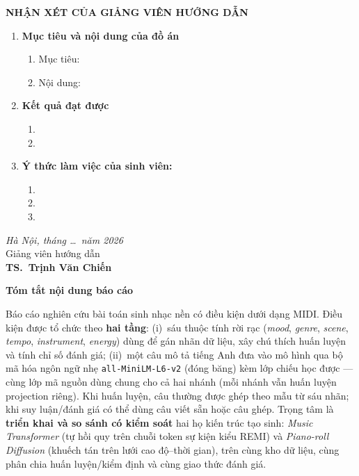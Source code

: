\documentclass[oneside, a4paper, 12pt]{book}
\theoremstyle{plain}
\theoremstyle{definition}
\theoremstyle{remark}
\begin{document}
\fontsize{13pt}{16pt}\selectfont
\bigbreak
\begin{center}
	{\bfseries NHẬN XÉT CỦA GIẢNG VIÊN HƯỚNG DẪN}
\end{center}
\bigbreak

\fontsize{12pt}{14pt}\selectfont
\begin{enumerate}
	\item [{\bfseries 1.}]{\bfseries Mục tiêu và nội dung của đồ án}
	\begin{enumerate}
		\item Mục tiêu:
		\item Nội dung:
	\end{enumerate}
	\item [{\bfseries 2.}] {\bfseries Kết quả đạt được}
	\begin{enumerate}
		\item
		\item
	\end{enumerate}
	\item [{\bfseries 3.}]{\bfseries Ý thức làm việc của sinh viên:}
\begin{enumerate}
	\item
	\item
	\item
\end{enumerate}
\end{enumerate}
\hspace{0.5\textwidth}
\begin{minipage}{0.5\textwidth}
	\noindent\begin{center}
		\textit{Hà Nội, tháng \ldots\ năm 2026} \\
		Giảng viên hướng dẫn\\ \vspace{2cm}
		\textbf{TS.\ Trịnh Văn Chiến}
	\end{center}
\end{minipage}
\restoregeometry


\newpage
\restoregeometry

\newpage
\fontsize{16pt}{18pt}\selectfont
\thispagestyle{empty}

{\bfseries Tóm tắt nội dung báo cáo}
\fontsize{12pt}{16pt}\selectfont
\bigskip

Báo cáo nghiên cứu bài toán sinh nhạc nền có điều kiện dưới dạng MIDI. Điều kiện được tổ chức theo \textbf{hai tầng}: (i)~sáu thuộc tính rời rạc (\textit{mood}, \textit{genre}, \textit{scene}, \textit{tempo}, \textit{instrument}, \textit{energy}) dùng để gán nhãn dữ liệu, xây chú thích huấn luyện và tính chỉ số đánh giá; (ii)~một câu mô tả tiếng Anh đưa vào mô hình qua bộ mã hóa ngôn ngữ nhẹ \texttt{all-MiniLM-L6-v2} (đóng băng) kèm lớp chiếu học được --- cùng lớp mã nguồn dùng chung cho cả hai nhánh (mỗi nhánh vẫn huấn luyện projection riêng). Khi huấn luyện, câu thường được ghép theo mẫu từ sáu nhãn; khi suy luận/đánh giá có thể dùng câu viết sẵn hoặc câu ghép. Trọng tâm là \textbf{triển khai và so sánh có kiểm soát} hai họ kiến trúc tạo sinh: \textit{Music Transformer} (tự hồi quy trên chuỗi token sự kiện kiểu REMI) và \textit{Piano-roll Diffusion} (khuếch tán trên lưới cao độ--thời gian), trên cùng kho dữ liệu, cùng phân chia huấn luyện/kiểm định và cùng giao thức đánh giá.
\end{document}
